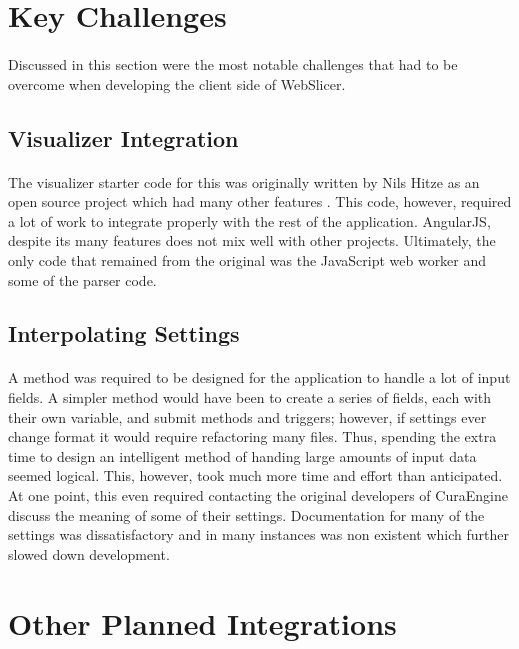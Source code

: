 \section{Key Challenges}
\paragraph{}
Discussed in this section were the most notable challenges that had to be overcome when developing the client side of WebSlicer.

\subsection{Visualizer Integration}
\paragraph{}
The visualizer starter code for this was originally written by Nils Hitze as an open source project which had many other features \citep{hitzeViewer-2015}.
This code, however, required a lot of work to integrate properly with the rest of the application.
AngularJS, despite its many features does not mix well with other projects.
Ultimately, the only code that remained from the original was the JavaScript web worker and some of the parser code.

\subsection{Interpolating Settings}
\paragraph{}
A method was required to be designed for the application to handle a lot of input fields.
A simpler method would have been to create a series of fields, each with their own variable, and submit methods and triggers; however, if settings ever change format it would require refactoring many files.
Thus, spending the extra time to design an intelligent method of handing large amounts of input data seemed logical.
This, however, took much more time and effort than anticipated.
At one point, this even required contacting the original developers of CuraEngine discuss the meaning of some of their settings.
Documentation for many of the settings was dissatisfactory and in many instances was non existent which further slowed down development.

\section{Other Planned Integrations}
